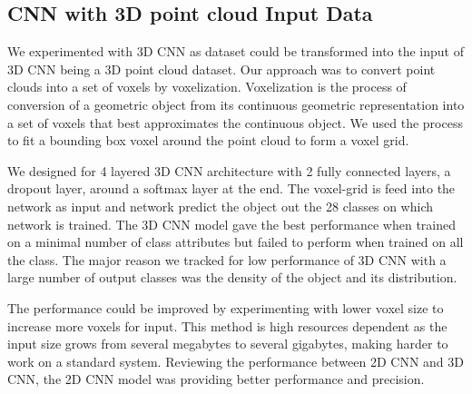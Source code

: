 \subsection{CNN with 3D point cloud Input Data}
We experimented with 3D CNN as dataset could be transformed into the input of 3D CNN being a 3D point cloud dataset. 
Our approach was to convert point clouds into a set of voxels by voxelization. Voxelization is the process of conversion of a geometric object from its continuous geometric representation into a set of voxels that best approximates the continuous
object. We used the process to fit a bounding box voxel around the point cloud to form a voxel grid.

We designed for 4 layered 3D CNN architecture with 2 fully connected layers, a dropout layer, around a softmax layer at the end. 
The voxel-grid is feed into the network as input and network predict the object out the 28 classes on which network is trained. 
The 3D CNN model gave the best performance when trained on a minimal number of class attributes but failed to perform when trained on all the class. 
The major reason we tracked for low performance of 3D CNN with a large number of output classes was the density of the object and its distribution.

The performance could be improved by experimenting with lower voxel size to increase more voxels for input. 
This method is high resources dependent as the input size grows from several megabytes to several gigabytes, making harder to work on a standard system.
Reviewing the performance between 2D CNN and 3D CNN, the 2D CNN model was providing better performance and precision.
